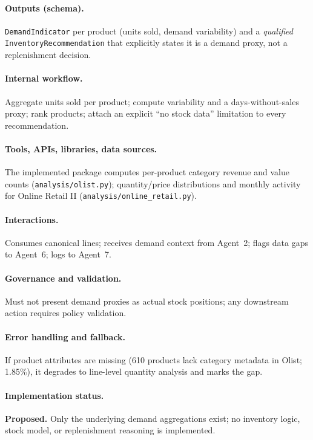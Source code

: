 \documentclass[11pt,a4paper]{article}
\newcommand{\code}[1]{\texttt{#1}}
\begin{document}
\paragraph{Outputs (schema).} \code{DemandIndicator} per product (units sold, demand variability) and a \emph{qualified} \code{InventoryRecommendation} that explicitly states it is a demand proxy, not a replenishment decision.

\paragraph{Internal workflow.} Aggregate units sold per product; compute variability and a days-without-sales proxy; rank products; attach an explicit ``no stock data'' limitation to every recommendation.

\paragraph{Tools, APIs, libraries, data sources.} The implemented package computes per-product category revenue and value counts (\code{analysis/olist.py}); quantity/price distributions and monthly activity for Online Retail II (\code{analysis/online\_retail.py}).

\paragraph{Interactions.} Consumes canonical lines; receives demand context from Agent~2; flags data gaps to Agent~6; logs to Agent~7.

\paragraph{Governance and validation.} Must not present demand proxies as actual stock positions; any downstream action requires policy validation.

\paragraph{Error handling and fallback.} If product attributes are missing (610 products lack category metadata in Olist; 1.85\%), it degrades to line-level quantity analysis and marks the gap.

\paragraph{Implementation status.} \textbf{Proposed.} Only the underlying demand aggregations exist; no inventory logic, stock model, or replenishment reasoning is implemented.
\end{document}
